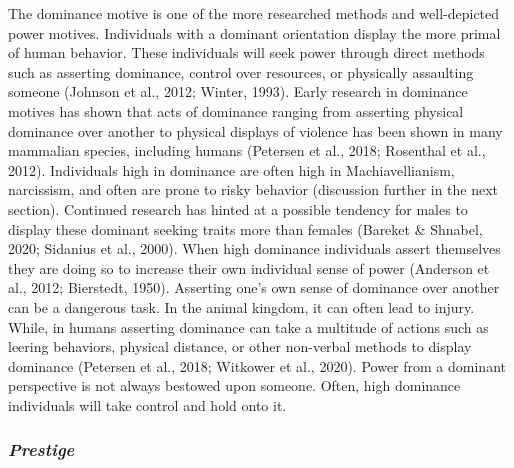 \documentclass[
  english,
  ,doc, 12pt, a4paper,floatsintext]{apa7}
\begin{document}
The dominance motive is one of the more researched methods and well-depicted power motives. Individuals with a dominant orientation display the more primal of human behavior. These individuals will seek power through direct methods such as asserting dominance, control over resources, or physically assaulting someone (Johnson et al., 2012; Winter, 1993). Early research in dominance motives has shown that acts of dominance ranging from asserting physical dominance over another to physical displays of violence has been shown in many mammalian species, including humans (Petersen et al., 2018; Rosenthal et al., 2012).
Individuals high in dominance are often high in Machiavellianism, narcissism, and often are prone to risky behavior (discussion further in the next section). Continued research has hinted at a possible tendency for males to display these dominant seeking traits more than females (Bareket \& Shnabel, 2020; Sidanius et al., 2000). When high dominance individuals assert themselves they are doing so to increase their own individual sense of power (Anderson et al., 2012; Bierstedt, 1950). Asserting one's own sense of dominance over another can be a dangerous task. In the animal kingdom, it can often lead to injury. While, in humans asserting dominance can take a multitude of actions such as leering behaviors, physical distance, or other non-verbal methods to display dominance (Petersen et al., 2018; Witkower et al., 2020). Power from a dominant perspective is not always bestowed upon someone. Often, high dominance individuals will take control and hold onto it.

\hypertarget{prestige}{%
\subsubsection{\texorpdfstring{\emph{Prestige}}{Prestige}}\label{prestige}}
\end{document}
